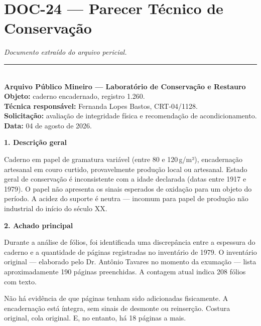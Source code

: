 \section*{\textbf{DOC-24} --- Parecer Técnico de Conservação}

\noindent \textit{Documento extraído do arquivo pericial.}

\vspace{0.5em}\noindent\rule{\textwidth}{0.5pt}\vspace{0.5em}

\\[-0.2em]

\noindent \textbf{Arquivo Público Mineiro --- Laboratório de Conservação e Restauro}\\
\noindent \textbf{Objeto:} caderno encadernado, registro 1.260.\\
\noindent \textbf{Técnica responsável:} Fernanda Lopes Bastos, CRT-04/1128.\\
\noindent \textbf{Solicitação:} avaliação de integridade física e recomendação de acondicionamento.\\
\noindent\textbf{Data:} 04 de agosto de 2026.

\noindent \textbf{1. Descrição geral}

\noindent Caderno em papel de gramatura variável (entre 80 e 120\,g/m²), encadernação artesanal em couro curtido, provavelmente produção local ou artesanal. Estado geral de conservação é inconsistente com a idade declarada (datas entre 1917 e 1979). O papel não apresenta os sinais esperados de oxidação para um objeto do período. A acidez do suporte é neutra --- incomum para papel de produção não industrial do início do século XX.

\noindent \textbf{2. Achado principal}

\noindent Durante a análise de fólios, foi identificada uma discrepância entre a espessura do caderno e a quantidade de páginas registradas no inventário de 1979. O inventário original --- elaborado pelo Dr. Antônio Tavares no momento da exumação --- lista aproximadamente 190 páginas preenchidas. A contagem atual indica 208 fólios com texto.

\noindent Não há evidência de que páginas tenham sido adicionadas fisicamente. A encadernação está íntegra, sem sinais de desmonte ou reinserção. Costura original, cola original. E, no entanto, há 18 páginas a mais.

